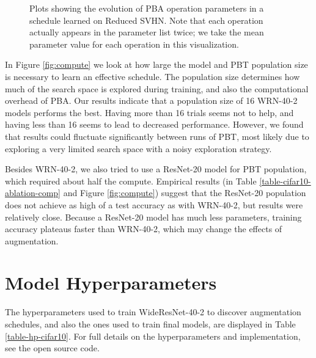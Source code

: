 \documentclass{article}
\begin{document}
\begin{figure}[t]
  \centering
  \begin{subfigure}[Operation magnitudes.]{
  \texttt{[image: figures/svhn-mag.png]}
  }
  \end{subfigure}
  \begin{subfigure}[Normalized plot of operation probability parameters over time.]{
  \texttt{[image: figures/svhn-prob.png]}
  }
  \end{subfigure}
  \caption{Plots showing the evolution of PBA operation parameters in a schedule learned on Reduced SVHN. Note that each operation actually appears in the parameter list twice; we take the mean parameter value for each operation in this visualization.}
  \label{fig:pba-svhn-schedule}
\end{figure}

In Figure \ref{fig:compute} we look at how large the model and PBT population size is necessary to learn an effective schedule. The population size determines how much of the search space is explored during training, and also the computational overhead of PBA. Our results indicate that a population size of 16 WRN-40-2 models performs the best. Having more than 16 trials seems not to help, and having less than 16 seems to lead to decreased performance. However, we found that results could fluctuate significantly between runs of PBT, most likely due to exploring a very limited search space with a noisy exploration strategy. 

Besides WRN-40-2, we also tried to use a ResNet-20 \cite{resnet-v2} model for PBT population, which required about half the compute. Empirical results (in  Table \ref{table-cifar10-ablation-comp} and Figure \ref{fig:compute}) suggest that the ResNet-20 population does not achieve as high of a test accuracy as with WRN-40-2, but results were relatively close. Because a ResNet-20 model has much less parameters, training accuracy plateaus faster than WRN-40-2, which may change the effects of augmentation.

\section{Model Hyperparameters}
The hyperparameters used to train WideResNet-40-2 to discover augmentation schedules, and also the ones used to train final models, are displayed in Table \ref{table-hp-cifar10}. For full details on the hyperparameters and implementation, see the open source code.
\end{document}
